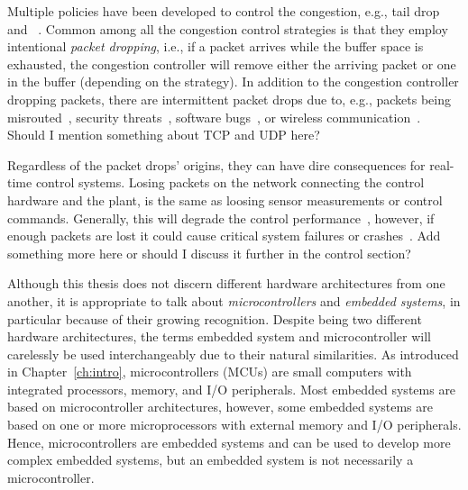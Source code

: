 Multiple policies have been developed to control the congestion, e.g., tail drop~\addref{} and ~\addref{}.
Common among all the congestion control strategies is that they employ intentional \emph{packet dropping}, i.e., if a packet arrives while the buffer space is exhausted, the congestion controller will remove either the arriving packet or one in the buffer (depending on the strategy).
In addition to the congestion controller dropping packets, there are intermittent packet drops due to, e.g., packets being misrouted~\addref{}, security threats~\addref{}, software bugs~\addref{}, or wireless communication~\addref{}.
\question%
{Should I mention something about TCP and UDP here?}
{}

Regardless of the packet drops' origins, they can have dire consequences for real-time control systems.
Losing packets on the network connecting the control hardware and the plant, is the same as loosing sensor measurements or control commands.
Generally, this will degrade the control performance~\addref{}, however, if enough packets are lost it could cause critical system failures or crashes~\addref{}.
\question%
{Add something more here or should I discuss it further in the control section?}
{}

Although this thesis does not discern different hardware architectures from one another, it is appropriate to talk about \emph{microcontrollers} and \emph{embedded systems}, in particular because of their growing recognition. 
Despite being two different hardware architectures, the terms embedded system and microcontroller will carelessly be used interchangeably due to their natural similarities.
As introduced in Chapter~\ref{ch:intro}, microcontrollers (MCUs) are small computers with integrated processors, memory, and I/O peripherals.
Most embedded systems are based on microcontroller architectures, however, some embedded systems are based on one or more microprocessors with external memory and I/O peripherals.
Hence, microcontrollers are embedded systems and can be used to develop more complex embedded systems, but an embedded system is not necessarily a microcontroller.

